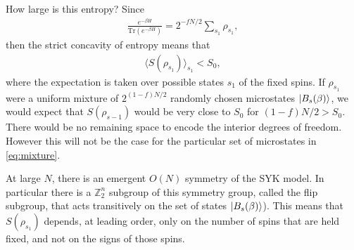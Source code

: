 \documentclass[12pt]{article}
\newcommand{\Tr}{\mathrm{Tr}}
\begin{document}
How large is this entropy? Since 
\begin{align}
\frac{e^{-\beta H}}{\Tr(e^{-\beta H})} = 2^{-f N/2}\sum_{s_1} \rho_{s_1},
\end{align}
then the strict concavity of entropy means that 
\begin{align}
\langle S(\rho_{s_1}) \rangle_{s_1} < S_0,
\end{align}
where the expectation is taken over possible states $s_1$ of the fixed spins. If $\rho_{s_1}$ were a uniform mixture of $2^{(1-f)N/2}$ randomly chosen microstates $\ket{B_s(\beta)}$, we would expect that $S(\rho_{s-1})$ would be very close to $S_0$ for $(1-f)N/2 > S_0$. There would be no remaining space to encode the interior degrees of freedom. However this will not be the case for the particular set of microstates in \eqref{eq:mixture}. 

At large $N$, there is an emergent $O(N)$ symmetry of the SYK model. In particular there is a $\mathbb{Z}_2^n$ subgroup of this symmetry group, called the flip subgroup, that acts transitively on the set of states $\ket{B_s(\beta)}$). This means that $S(\rho_{s_1})$ depends, at leading order, only on the number of spins that are held fixed, and not on the signs of those spins.
\end{document}
